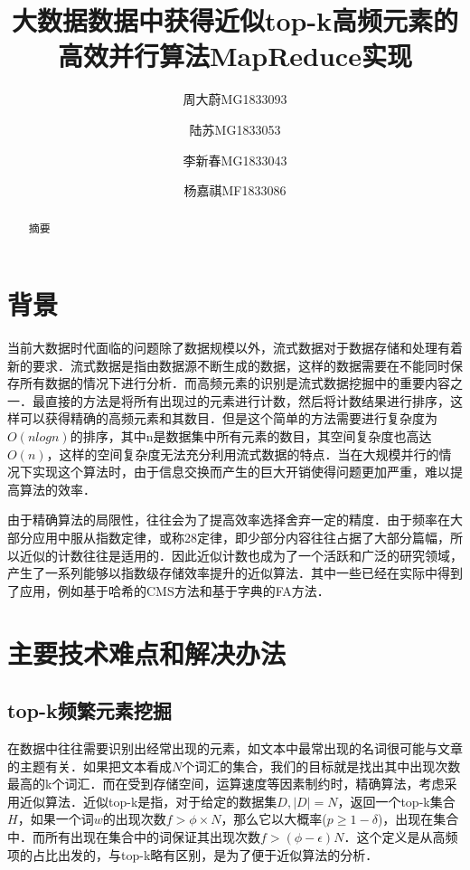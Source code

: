 \documentclass[a4paper,UTF8]{article}
\numberwithin{equation}{section}
\begin{document}
\title{大数据数据中获得近似top-k高频元素的\\
高效并行算法MapReduce实现}
\author[1]{周大蔚MG1833093}
\author[1]{陆苏MG1833053}
\author[1]{李新春MG1833043}
\author[1]{杨嘉祺MF1833086}
\date{}

\maketitle

\begin{abstract} 
摘要
\end{abstract}

\section{背景}

当前大数据时代面临的问题除了数据规模以外，流式数据对于数据存储和处理有着新的要求．流式数据是指由数据源不断生成的数据，这样的数据需要在不能同时保存所有数据的情况下进行分析．而高频元素的识别是流式数据挖掘中的重要内容之一．最直接的方法是将所有出现过的元素进行计数，然后将计数结果进行排序，这样可以获得精确的高频元素和其数目．但是这个简单的方法需要进行复杂度为$O(nlogn)$的排序，其中n是数据集中所有元素的数目，其空间复杂度也高达$O(n)$，这样的空间复杂度无法充分利用流式数据的特点．当在大规模并行的情况下实现这个算法时，由于信息交换而产生的巨大开销使得问题更加严重，难以提高算法的效率．

由于精确算法的局限性，往往会为了提高效率选择舍弃一定的精度．由于频率在大部分应用中服从指数定律，或称28定律，即少部分内容往往占据了大部分篇幅，所以近似的计数往往是适用的．因此近似计数也成为了一个活跃和广泛的研究领域，产生了一系列能够以指数级存储效率提升的近似算法．其中一些已经在实际中得到了应用，例如基于哈希的CMS方法和基于字典的FA方法．

\section{主要技术难点和解决办法}

\subsection{top-k频繁元素挖掘}

在数据中往往需要识别出经常出现的元素，如文本中最常出现的名词很可能与文章的主题有关．如果把文本看成$N$个词汇的集合，我们的目标就是找出其中出现次数最高的k个词汇．而在受到存储空间，运算速度等因素制约时，精确算法，考虑采用近似算法．近似top-k是指，对于给定的数据集$D, |D|=N$，返回一个top-k集合$H$，如果一个词$w$的出现次数$f >\phi \times N$，那么它以大概率($p \ge 1 - \delta$)，出现在集合中．而所有出现在集合中的词保证其出现次数$f > (\phi - \epsilon)N$．这个定义是从高频项的占比出发的，与top-k略有区别，是为了便于近似算法的分析．
\end{document}
